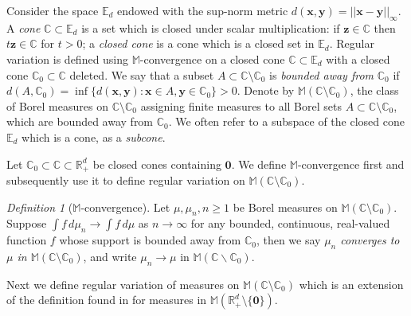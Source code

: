 \documentclass[aos]{imsart}
\numberwithin{equation}{section}
\theoremstyle{plain} %
\theoremstyle{remark}
\newtheorem{dfn}[theorem]{Definition}
\newcommand{\C}{\mathbb{C}}
\newcommand{\E}{\mathbb{E}}
\newcommand{\M}{\mathbb{M}}
\newcommand{\R}{\mathbb{R}}
\newcommand{\VF}[1]{{\color{blue} #1}}
\def\bC{\mathbb{C}}
\def\bzero{\boldsymbol 0}
\def\bx{\boldsymbol x}
\def\by{\boldsymbol y}
\def\bz{\boldsymbol z}
\begin{document}
Consider the space $\E_d$ endowed with the sup-norm metric $d(\bx,\by)=||\bx-\by||_{\infty}$. A \emph{cone} $\mathbb{C} \subset \E_d $ is a set which is closed under scalar multiplication: if $\bz \in
\mathbb{C}$ then $t\bz \in \mathbb{C}$ for $t>0$; a \emph{closed cone}  is a cone which is a closed set in $\E_d$.
Regular variation is defined using $\M$-convergence on a closed
cone $\mathbb{C}\subset \mathbb{E}_d$ with a closed cone  $\mathbb{C}_0 \subset  \mathbb{C}$ deleted.  We say that a  subset $A \subset \mathbb{C} \setminus \mathbb{C}_0$ is {\it bounded away from\/} $\mathbb{C}_0$ if $d(A,\mathbb{C}_0)=\inf\{d(\bx,\by):\bx\in A,\by\in\C_0 \}>0$. Denote by $\M(\mathbb{C}\setminus \mathbb{C}_0)$, the class of Borel measures on $\C\setminus\C_0$ assigning finite measures to all Borel sets $A\subset \C\setminus\C_0$, which are bounded away from $\C_0$. {We often refer to a subspace of the closed cone $\E_d$ which is a cone, as a \emph{subcone}.}

Let $\C_0\subset \C\subset \R_+^d$ be closed cones containing $\bzero$. We  define $\M$-convergence first and subsequently use it to define regular variation on $\M(\mathbb{C}\setminus \mathbb{C}_0)$.
\begin{dfn}[$\M$-convergence]\label{def:mconv}
Let $\mu,\mu_n, n\ge 1$ be Borel measures on $\M(\mathbb{C}\setminus \mathbb{C}_0)$. Suppose $\int f\,d\mu_n\to\int f\,d\mu$ as $n\to\infty$ for any bounded, continuous, real-valued function $f$ whose support is bounded away from $\C_0$, then we say {\it $\mu_n$ converges to $\mu$ in $\M(\mathbb{C}\setminus \mathbb{C}_0)$}, and write $\mu_n\to\mu$ in $\M(\C\backslash\C_0)$.
\end{dfn}
 Next we define regular variation of measures on $\M(\bC\setminus\bC_0)$ which is an extension of the definition found in \cite{hult:lindskog:2006a} for measures in $\M(\R_+^d\setminus \{\bzero\})$.

 
\end{document}
